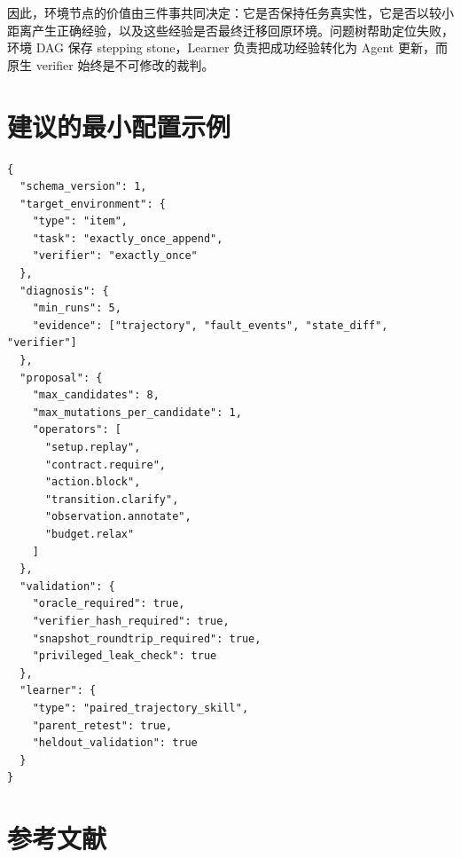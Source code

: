 \documentclass[11pt,a4paper,fontset=fandol]{ctexart}
\begin{document}
因此，环境节点的价值由三件事共同决定：它是否保持任务真实性，它是否以较小距离产生正确经验，以及这些经验是否最终迁移回原环境。问题树帮助定位失败，环境 DAG 保存 stepping stone，Learner 负责把成功经验转化为 Agent 更新，而原生 verifier 始终是不可修改的裁判。

\appendix

\section{建议的最小配置示例}

\begin{lstlisting}
{
  "schema_version": 1,
  "target_environment": {
    "type": "item",
    "task": "exactly_once_append",
    "verifier": "exactly_once"
  },
  "diagnosis": {
    "min_runs": 5,
    "evidence": ["trajectory", "fault_events", "state_diff", "verifier"]
  },
  "proposal": {
    "max_candidates": 8,
    "max_mutations_per_candidate": 1,
    "operators": [
      "setup.replay",
      "contract.require",
      "action.block",
      "transition.clarify",
      "observation.annotate",
      "budget.relax"
    ]
  },
  "validation": {
    "oracle_required": true,
    "verifier_hash_required": true,
    "snapshot_roundtrip_required": true,
    "privileged_leak_check": true
  },
  "learner": {
    "type": "paired_trajectory_skill",
    "parent_retest": true,
    "heldout_validation": true
  }
}
\end{lstlisting}

\section{参考文献}
\end{document}
